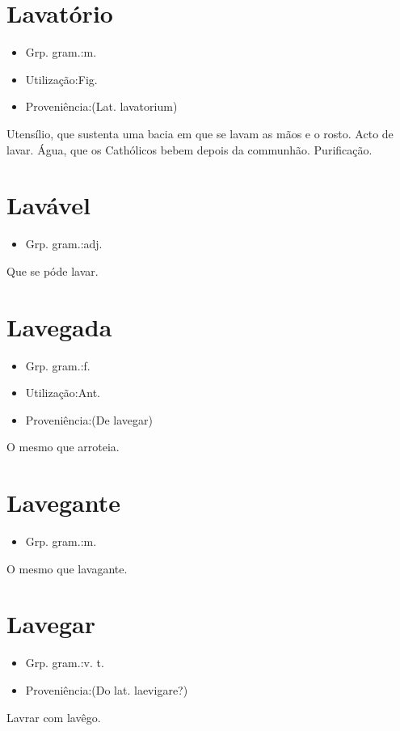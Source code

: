 \section{Lavatório}
\begin{itemize}
\item {Grp. gram.:m.}
\end{itemize}
\begin{itemize}
\item {Utilização:Fig.}
\end{itemize}
\begin{itemize}
\item {Proveniência:(Lat. \textunderscore lavatorium\textunderscore )}
\end{itemize}
Utensílio, que sustenta uma bacia em que se lavam as mãos e o rosto.
Acto de lavar.
Água, que os Cathólicos bebem depois da communhão.
Purificação.
\section{Lavável}
\begin{itemize}
\item {Grp. gram.:adj.}
\end{itemize}
Que se póde lavar.
\section{Lavegada}
\begin{itemize}
\item {Grp. gram.:f.}
\end{itemize}
\begin{itemize}
\item {Utilização:Ant.}
\end{itemize}
\begin{itemize}
\item {Proveniência:(De \textunderscore lavegar\textunderscore )}
\end{itemize}
O mesmo que \textunderscore arroteia\textunderscore .
\section{Lavegante}
\begin{itemize}
\item {Grp. gram.:m.}
\end{itemize}
O mesmo que \textunderscore lavagante\textunderscore .
\section{Lavegar}
\begin{itemize}
\item {Grp. gram.:v. t.}
\end{itemize}
\begin{itemize}
\item {Proveniência:(Do lat. \textunderscore laevigare\textunderscore ?)}
\end{itemize}
Lavrar com lavêgo.

